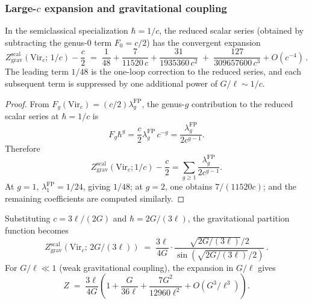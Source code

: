 \subsubsection{Large-$c$ expansion and gravitational coupling}

\begin{proposition}
In the semiclassical specialization $\hbar = 1/c$, the reduced scalar
series \textup{(}obtained by subtracting the genus-$0$ term
$F_0=c/2$\textup{)} has the convergent expansion
\begin{equation}%
Z_{\mathrm{grav}}^{\mathrm{scal}}(\mathrm{Vir}_c;\,1/c) - \frac{c}{2}
\;=\;
\frac{1}{48} + \frac{7}{11520\,c} + \frac{31}{1935360\,c^2}
\;+\; \frac{127}{309657600\,c^3} + O(c^{-4})\,.
\end{equation}
The leading term $1/48$ is the one-loop correction to the reduced
series, and each subsequent term is suppressed by one additional power
of $G/\ell \sim 1/c$.
\end{proposition}

\begin{proof}
From $F_g(\mathrm{Vir}_c) = (c/2)\lambda_g^{\mathrm{FP}}$, the
genus-$g$ contribution to the reduced scalar series at $\hbar = 1/c$ is
\[
F_g \hbar^g = \frac{c}{2}\lambda_g^{\mathrm{FP}}\,c^{-g}
= \frac{\lambda_g^{\mathrm{FP}}}{2c^{g-1}}.
\]
Therefore
\[
Z_{\mathrm{grav}}^{\mathrm{scal}}(\mathrm{Vir}_c;1/c) - \frac{c}{2}
= \sum_{g \geq 1} \frac{\lambda_g^{\mathrm{FP}}}{2c^{g-1}}.
\]
At $g = 1$, $\lambda_1^{\mathrm{FP}} = 1/24$, giving $1/48$; at
$g = 2$, one obtains $7/(11520c)$; and the remaining coefficients are
computed similarly.
\end{proof}

\begin{proposition}
Substituting $c = 3\ell/(2G)$ and $\hbar = 2G/(3\ell)$, the gravitational partition function becomes
\begin{equation}%
Z_{\mathrm{grav}}^{\mathrm{scal}}(\mathrm{Vir}_c;\,2G/(3\ell)) \;=\; \frac{3\ell}{4G} \cdot \frac{\sqrt{2G/(3\ell)}/2}{\sin(\sqrt{2G/(3\ell)}/2)}\,.
\end{equation}
For $G/\ell \ll 1$ (weak gravitational coupling), the expansion in $G/\ell$ gives
\begin{equation}%
Z \;=\; \frac{3\ell}{4G}\left(1 + \frac{G}{36\ell} + \frac{7G^2}{12960\ell^2} + O(G^3/\ell^3)\right).
\end{equation}
\end{proposition}

